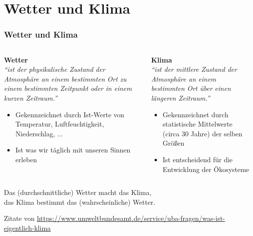 \section{Wetter und Klima}
\begin{frame}


	\frametitle{Wetter und Klima}
	\begin{columns}[onlytextwidth]
		\begin{column}[t]{0.49\linewidth}
			\textbf{Wetter}\\
			\textit{\enquote{ist der physikalische Zustand der Atmosphäre an einem bestimmten Ort zu einem \alert{bestimmten Zeitpunkt} oder in einem kurzen Zeitraum.}}
			\begin{itemize}
				\item Gekennzeichnet durch Ist-Werte von Temperatur, Luftfeuchtigkeit, Niederschlag, ...
				\item Ist was wir täglich mit unseren Sinnen erleben
			\end{itemize}
		\end{column}%
		\begin{column}[t]{0.49\linewidth}
			\textbf{Klima}\\
			\textit{\enquote{ist der mittlere Zustand der Atmosphäre an einem bestimmten Ort über einen \alert{längeren Zeitraum.}}}
			\begin{itemize}
				\item Gekennzeichnet durch statistische Mittelwerte (circa 30 Jahre) der selben Größen
				\item Ist entscheidend für die Entwicklung der Ökosysteme
			\end{itemize}
		\end{column}%
	\end{columns}
	\pause
	\bigskip
	\begin{center}
		Das (durchschnittliche) Wetter macht das Klima, \\
		das Klima bestimmt das (wahrscheinliche) Wetter.
	\end{center}

	\vfill
	\tiny{Zitate von \url{https://www.umweltbundesamt.de/service/uba-fragen/was-ist-eigentlich-klima}}


\end{frame}
